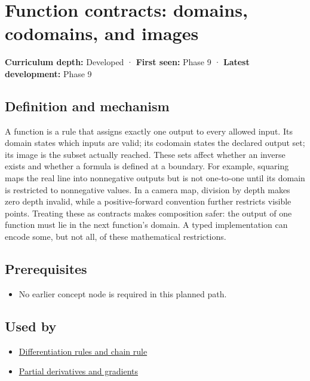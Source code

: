 \hypertarget{appendix-a59658325cd6}{}\label{referencestart:appendix-a59658325cd6}
\section{Function contracts: domains, codomains, and images}\label{appendix-a59658325cd6-function-contracts-domains-codomains-and-images}

\textbf{Curriculum depth:} Developed · \textbf{First seen:} Phase 9 · \textbf{Latest development:} Phase 9

\subsection{Definition and mechanism}\label{appendix-a59658325cd6-definition-and-mechanism}

A function is a rule that assigns exactly one output to every allowed input. Its domain states which inputs are valid; its codomain states the declared output set; its image is the subset actually reached. These sets affect whether an inverse exists and whether a formula is defined at a boundary. For example, squaring maps the real line into nonnegative outputs but is not one-to-one until its domain is restricted to nonnegative values. In a camera map, division by depth makes zero depth invalid, while a positive-forward convention further restricts visible points. Treating these as contracts makes composition safer: the output of one function must lie in the next function's domain. A typed implementation can encode some, but not all, of these mathematical restrictions.

\subsection{Prerequisites}\label{appendix-a59658325cd6-prerequisites}

\begin{itemize}
\tightlist
\item
  No earlier concept node is required in this planned path.
\end{itemize}

\subsection{Used by}\label{appendix-a59658325cd6-used-by}

\begin{itemize}
\tightlist
\item
  \hyperref[appendix-d9f70bdfbc92]{Differentiation rules and chain rule}
\item
  \hyperref[appendix-677b59746ae0]{Partial derivatives and gradients}
\end{itemize}

